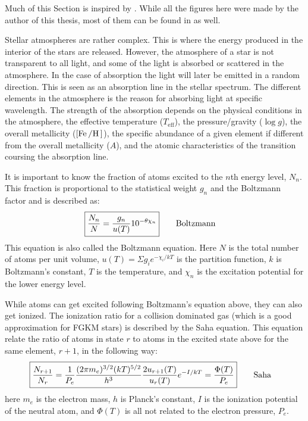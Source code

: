 Much of this Section is inspired by \citet{Gray2006}. While all the figures here were made by the
author of this thesis, most of them can be found in \citet{Gray2006} as well.

Stellar atmospheres are rather complex. This is where the energy produced in the interior of the
stars are released. However, the atmosphere of a star is not transparent to all light, and some of
the light is absorbed or scattered in the atmosphere. In the case of absorption the light will later
be emitted in a random direction. This is seen as an absorption line in the stellar spectrum. The
different elements in the atmosphere is the reason for absorbing light at specific wavelength. The
strength of the absorption depends on the physical conditions in the atmosphere, the effective
temperature ($T_\mathrm{eff}$), the pressure/gravity ($\log g$), the overall metallicity
($[\ion{Fe}/\ion{H}]$), the specific abundance of a given element if different from the overall
metallicity ($A$), and the atomic characteristics of the transition coursing the absorption line.

It is important to know the fraction of atoms excited to the $n$th energy level, $N_n$. This
fraction is proportional to the statistical weight $g_n$ and the Boltzmann factor and is described
as:
\begin{align}
    \Aboxed{ \frac{N_n}{N} = \frac{g_n}{u(T)} 10^{-\theta\chi_n}} \tag*{Boltzmann}
\end{align}
This equation is also called the Boltzmann equation. Here $N$ is the total number of atoms per unit
volume, $u(T)=\Sigma g_i e^{-\chi_i/kT}$ is the partition function, $k$ is Boltzmann's constant, $T$
is the temperature, and $\chi_n$ is the excitation potential for the lower energy level.

While atoms can get excited following Boltzmann's equation above, they can also get ionized. The
ionization ratio for a collision dominated gas (which is a good approximation for FGKM stars) is
described by the Saha equation. This equation relate the ratio of atoms in state $r$ to atoms in the
excited state above for the same element, $r+1$, in the following way:
\begin{align}
  \Aboxed{ \frac{N_{r+1}}{N_r} = \frac{1}{P_e} \frac{(2\pi m_e)^{3/2}(kT)^{5/2}}{h^3} \frac{2u_{r+1}(T)}{u_r(T)} e^{-I/kT} = \frac{\Phi(T)}{P_e}} \tag*{Saha}
\end{align}
here $m_e$ is the electron mass, $h$ is Planck's constant, $I$ is the ionization potential of the
neutral atom, and $\Phi(T)$ is all not related to the electron pressure, $P_e$.

